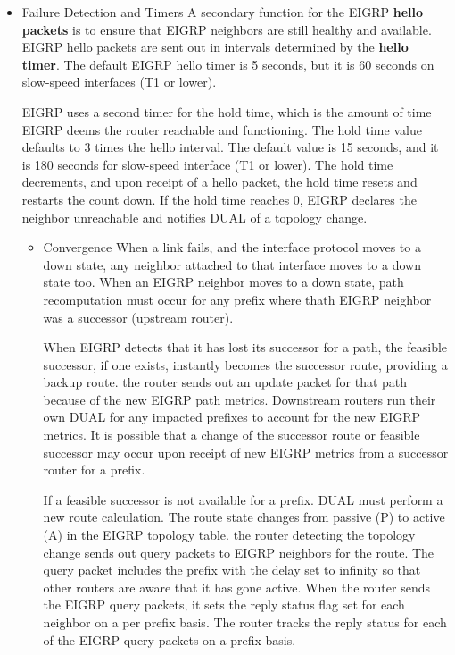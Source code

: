 \documentclass{article}
\begin{document}
\begin{itemize}
	\item Failure Detection and Timers
		A secondary function for the EIGRP \textbf{hello packets} is to ensure that EIGRP neighbors are still healthy and available. EIGRP hello packets are sent out in intervals determined by the \textbf{hello timer}. The default EIGRP hello timer is 5 seconds, but it is 60 seconds on slow-speed interfaces (T1 or lower).

		EIGRP uses a second timer for the hold time, which is the amount of time EIGRP deems the router reachable and functioning. The hold time value defaults to 3 times the hello interval. The default value is 15 seconds, and it is 180 seconds for slow-speed interface (T1 or lower). The hold time decrements, and upon receipt of a hello packet, the hold time resets and restarts the count down. If the hold time reaches 0, EIGRP declares the neighbor unreachable and notifies DUAL of a topology change.

		\begin{itemize}
			\item Convergence
				When a link fails, and the interface protocol moves to a down state, any neighbor attached to that interface moves to a down state too. When an EIGRP neighbor moves to a down state, path recomputation must occur for any prefix where thath EIGRP neighbor was a successor (upstream router).

				When EIGRP detects that it has lost its successor for a path, the feasible successor, if one exists, instantly becomes the successor route, providing a backup route. the router sends out an update packet for that path because of the new EIGRP path metrics. Downstream routers run their own DUAL for any impacted prefixes to account for the new EIGRP metrics. It is possible that a change of the successor route or feasible successor may occur upon receipt of new EIGRP metrics from a successor router for a prefix.

				If a feasible successor is not available for a prefix. DUAL must perform a new route calculation. The route state changes from passive (P) to active (A) in the EIGRP topology table. the router detecting the topology change sends out query packets to EIGRP neighbors for the route. The query packet includes the prefix with the delay set to infinity so that other routers are aware that it has gone active. When the router sends the EIGRP query packets, it sets the reply status flag set for each neighbor on a per prefix basis. The router tracks the reply status for each of the EIGRP query packets on a prefix basis.


\end{itemize}
\end{itemize}
\end{document}
